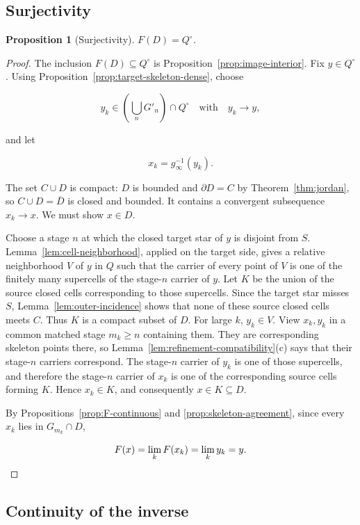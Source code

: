 \documentclass[11pt]{article}
\theoremstyle{mainplain}
\newtheorem{proposition}[theorem]{Proposition}
\theoremstyle{mainroman}
\theoremstyle{definition}
\numberwithin{equation}{section}
\begin{document}
\subsection{Surjectivity}\label{surjectivity}

\begin{proposition}[Surjectivity]\label{prop:F-surjective}
\(F(D)=Q^\circ\).
\end{proposition}
\begin{proof}
The inclusion \(F(D)\subseteq Q^\circ\) is
Proposition~\ref{prop:image-interior}. Fix \(y\in Q^\circ\). Using
Proposition~\ref{prop:target-skeleton-dense}, choose

\[
y_k\in\left(\bigcup_nG'_n\right)\cap Q^\circ
\quad\text{with}\quad
y_k\to y,
\]

and let

\[
x_k=g_\infty^{-1}(y_k).
\]

The set \(C\cup D\) is compact: \(D\) is bounded and \(\partial D=C\) by Theorem~\ref{thm:jordan}, so \(C\cup D=\overline D\) is closed and bounded. It contains a convergent subsequence \(x_k\to x\). We must show \(x\in D\).

Choose a stage \(n\) at which the closed target star of \(y\) is disjoint from \(S\). Lemma~\ref{lem:cell-neighborhood}, applied on the target side, gives a relative neighborhood \(V\) of \(y\) in \(Q\) such that the carrier of every point of \(V\) is one of the finitely many supercells of the stage-\(n\) carrier of \(y\). Let \(K\) be the union of the source closed cells corresponding to those supercells. Since the target star misses \(S\), Lemma~\ref{lem:outer-incidence} shows that none of these source closed cells meets \(C\). Thus \(K\) is a compact subset of \(D\). For large $k$, $y_k\in V$. View $x_k,y_k$ in a common matched
stage $m_k\ge n$ containing them. They are corresponding skeleton
points there, so
Lemma~\ref{lem:refinement-compatibility}\textup{(c)} says that their
stage-$n$ carriers correspond. The stage-$n$ carrier of $y_k$ is one
of those supercells, and therefore the stage-$n$ carrier
of $x_k$ is one of the corresponding source cells forming $K$.
Hence $x_k\in K$, and consequently $x\in K\subseteq D$.

By Propositions~\ref{prop:F-continuous} and
\ref{prop:skeleton-agreement}, since every \(x_k\) lies in
\(G_{m_k}\cap D\),

\[
F(x)
 =
\lim_kF(x_k)
 =
\lim_ky_k
 =
y. \qedhere
\]
\end{proof}

\subsection{Continuity of the inverse}\label{continuity-of-the-inverse}
\end{document}

